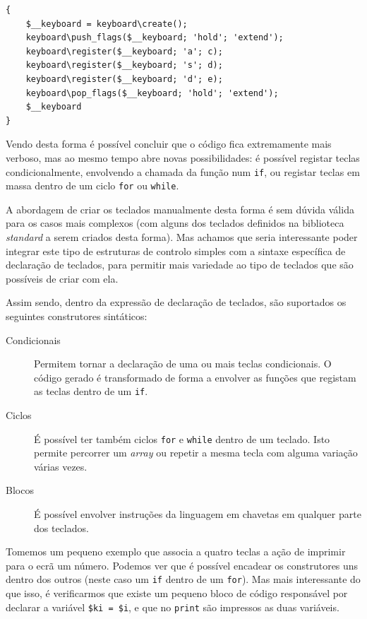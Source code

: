 \begin{lstlisting}[caption={Código gerado automaticamente para criação do teclado descrito no capitulo anterior}]
{
    $__keyboard = keyboard\create();
    keyboard\push_flags($__keyboard; 'hold'; 'extend');
    keyboard\register($__keyboard; 'a'; c);
    keyboard\register($__keyboard; 's'; d);
    keyboard\register($__keyboard; 'd'; e);
    keyboard\pop_flags($__keyboard; 'hold'; 'extend');
    $__keyboard
}
\end{lstlisting}

Vendo desta forma é possível concluir que o código fica extremamente mais verboso, mas ao mesmo tempo abre novas possibilidades: é possível registar teclas condicionalmente, envolvendo a chamada da função num \texttt{if}, ou registar teclas em massa dentro de um ciclo \texttt{for} ou \texttt{while}.

A abordagem de criar os teclados manualmente desta forma é sem dúvida válida para os casos mais complexos (com alguns dos teclados definidos na biblioteca \textit{standard} a serem criados desta forma). Mas achamos que seria interessante poder integrar este tipo de estruturas de controlo simples com a sintaxe específica de declaração de teclados, para permitir mais variedade ao tipo de teclados que são possíveis de criar com ela.

Assim sendo, dentro da expressão de declaração de teclados, são suportados os seguintes construtores sintáticos:
\begin{description}
 \item[Condicionais] Permitem tornar a declaração de uma ou mais teclas condicionais. O código gerado é transformado de forma a envolver as funções que registam as teclas dentro de um \texttt{if}.
 \item[Ciclos] É possível ter também ciclos \texttt{for} e \texttt{while} dentro de um teclado. Isto permite percorrer um \textit{array} ou repetir a mesma tecla com alguma variação várias vezes.
 \item[Blocos] É possível envolver instruções da linguagem em chavetas em qualquer parte dos teclados.
\end{description}

Tomemos um pequeno exemplo que associa a quatro teclas a ação de imprimir para o ecrã um número. Podemos ver que é possível encadear os construtores uns dentro dos outros (neste caso um \texttt{if} dentro de um \texttt{for}). Mas mais interessante do que isso, é verificarmos que existe um pequeno bloco de código responsável por declarar a variável \texttt{\$ki = \$i}, e que no \texttt{print} são impressos as duas variáveis.

